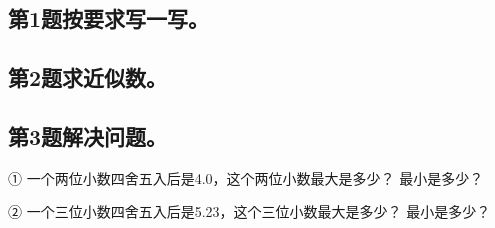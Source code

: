 \subsection*{第1题\quad 按要求写一写。}
\subsection*{第2题\quad 求近似数。}
\subsection*{第3题\quad 解决问题。}
\noindent ① 一个两位小数四舍五入后是4.0，这个两位小数最大是多少？ 最小是多少？\par
{}
\noindent ② 一个三位小数四舍五入后是5.23，这个三位小数最大是多少？ 最小是多少？\par
{}
